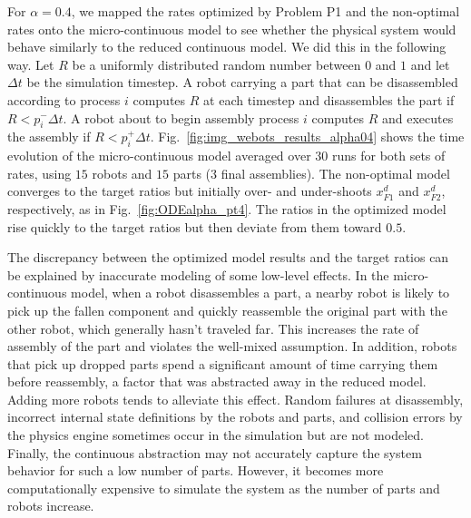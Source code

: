 For $\alpha=0.4$, we mapped the rates optimized by Problem P1 and
the non-optimal rates onto the micro-continuous model to see whether
the physical system would behave similarly to the reduced continuous
model.  We did this in the following way.  Let $R$ be a uniformly
distributed random number between $0$ and $1$ and let $\Delta t$ be
the simulation timestep.  A robot carrying a part that can be
disassembled according to process $i$ computes $R$ at each timestep
and disassembles the part if $R < p_i^- \Delta t$. A robot about to
begin assembly process $i$ computes $R$ and executes the assembly if
$R < p_i^+ \Delta t$.  Fig.~\ref{fig:img_webots_results_alpha04}
shows the time evolution of the micro-continuous model averaged over
$30$ runs for both sets of rates, using $15$ robots and $15$ parts
($3$ final assemblies).  The non-optimal model converges to the
target ratios but initially over- and under-shoots $x_{F1}^d$ and
$x_{F2}^d$, respectively, as in Fig.~\ref{fig:ODEalpha_pt4}.  The
ratios in the optimized model rise quickly to the target ratios but
then deviate from them toward $0.5$.


The discrepancy between the optimized model results and the target
ratios can be explained by inaccurate modeling of some low-level
effects.  In the micro-continuous model, when a robot disassembles a
part, a nearby robot is likely to pick up the fallen component and
quickly reassemble the original part with the other robot, which
generally hasn't traveled far.  This increases the rate of assembly
of the part and violates the well-mixed assumption.  In addition,
robots that pick up dropped parts spend a significant amount of time
carrying them before reassembly, a factor that was abstracted away
in the reduced model.  Adding more robots tends to alleviate this
effect.  Random failures at disassembly, incorrect internal state
definitions by the robots and parts, and collision errors by the
physics engine sometimes occur in the simulation but are not
modeled. Finally, the continuous abstraction may not accurately
capture the system behavior for such a low number of parts. However,
it becomes more computationally expensive to simulate the system as
the number of parts and robots increase.


